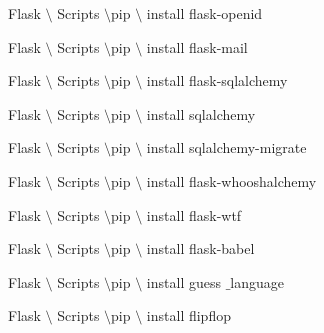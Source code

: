 \vspace{14pt}
\noindent 
{\fontsize{14pt}{14pt}\selectfont Flask $  \setminus  $ Scripts  $  \setminus  $pip $  \setminus  $ install flask-openid \\} \par
\vspace{14pt}
\noindent 
{\fontsize{14pt}{14pt}\selectfont Flask $  \setminus  $ Scripts  $  \setminus  $pip $  \setminus  $ install flask-mail \\} \par
\vspace{14pt}
\noindent 
{\fontsize{14pt}{14pt}\selectfont Flask $  \setminus  $ Scripts  $  \setminus  $pip $  \setminus  $ install flask-sqlalchemy \\} \par
\vspace{14pt}
\noindent 
{\fontsize{14pt}{14pt}\selectfont Flask $  \setminus  $ Scripts  $  \setminus  $pip $  \setminus  $ install sqlalchemy \\} \par
\vspace{14pt}
\noindent 
{\fontsize{14pt}{14pt}\selectfont Flask $  \setminus  $ Scripts  $  \setminus  $pip $  \setminus  $ install sqlalchemy-migrate \\} \par
\vspace{14pt}
\noindent 
{\fontsize{14pt}{14pt}\selectfont Flask $  \setminus  $ Scripts  $  \setminus  $pip $  \setminus  $ install flask-whooshalchemy \\} \par
\vspace{14pt}
\noindent 
{\fontsize{14pt}{14pt}\selectfont Flask $  \setminus  $ Scripts  $  \setminus  $pip $  \setminus  $ install flask-wtf \\} \par
\vspace{14pt}
\noindent 
{\fontsize{14pt}{14pt}\selectfont Flask $  \setminus  $ Scripts  $  \setminus  $pip $  \setminus  $ install flask-babel \\} \par
\vspace{14pt}
\noindent 
{\fontsize{14pt}{14pt}\selectfont Flask $  \setminus  $ Scripts  $  \setminus  $pip $  \setminus  $ install guess $  \_  $language \\} \par
\vspace{14pt}
\noindent 
{\fontsize{14pt}{14pt}\selectfont Flask $  \setminus  $ Scripts  $  \setminus  $pip $  \setminus  $ install flipflop \\} \par
